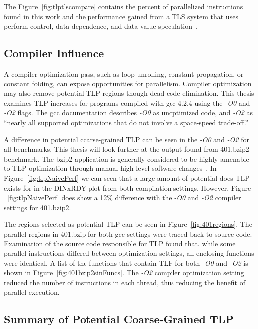 {The Figure~\ref{fig:tlptlscompare} contains the percent of parallelized instructions found in this work and the performance gained from a TLS system that uses perform control, data dependence, and data value speculation~\cite{kejariwal:2007:tap}.

\subsection {Compiler Influence}

A compiler optimization pass, such as loop unrolling, constant propagation, or constant folding, can expose opportunities for parallelism. Compiler optimization may also remove potential TLP regions though dead-code elimination.  This thesis examines TLP increases for programs compiled with gcc 4.2.4 using the \textit{-O0} and \textit{-O2} flags.  The gcc documentation describes \textit{-O0} as unoptimized code, and \textit{-O2} as ``nearly all supported optimizations that do not involve a space-speed trade-off.''

A difference in potential coarse-grained TLP can be seen in the \textit{-O0} and \textit{-O2} for all benchmarks.  This thesis will look further at the output found from 401.bzip2 benchmark.  The bzip2 application is generally considered to be highly amenable to TLP optimization through manual high-level software changes~\cite{gilchrist:04:pdcs}.  In Figure~\ref{fig:tlpNaivePerf} we can seen that a large amount of potential does TLP exists for in the DINxRDY plot from both compilation settings.  However, Figure ~\ref{fig:tlpNaivePerf} does show a 12\% difference with the \textit{-O0} and \textit{-O2} compiler settings for 401.bzip2.

The regions selected as potential TLP can be seen in Figure~\ref{fig:401regions}.  The parallel regions in 401.bzip for both gcc settings were traced back to source code.  Examination of the source code responsible for TLP found that, while some parallel instructions differed between optimization settings, all enclosing functions were identical.  A list of the functions that contain TLP for both \textit{-O0} and \textit{-O2} is shown in Figure~\ref{fig:401bzip2sinFuncs}.  The \textit{-O2} compiler optimization setting reduced the number of instructions in each thread, thus reducing the benefit of parallel execution.

\subsection{Summary of Potential Coarse-Grained TLP}

}
